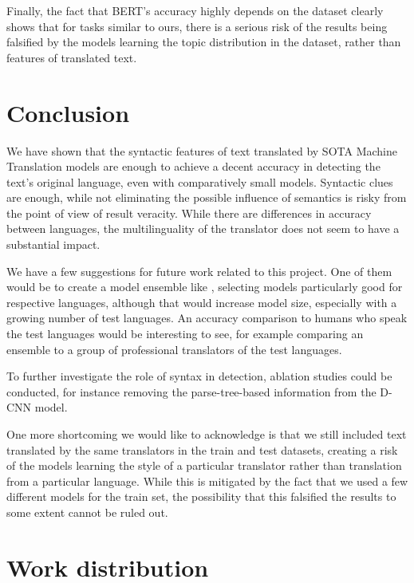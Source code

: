 \documentclass[twocolumn]{article}
\begin{document}
Finally, the fact that BERT's accuracy highly depends on the dataset clearly shows that for tasks similar to ours, there is a serious risk of the results being falsified by the models learning the topic distribution in the dataset, rather than features of translated text.


\section*{Conclusion}

We have shown that the syntactic features of text translated by SOTA Machine Translation models are enough to achieve a decent accuracy in detecting the text's original language, even with comparatively small models. Syntactic clues are enough, while not eliminating the possible influence of semantics is risky from the point of view of result veracity. While there are differences in accuracy between languages, the multilinguality of the translator does not seem to have a substantial impact.

We have a few suggestions for future work related to this project. One of them would be to create a model ensemble like \cite{roundtrip}, selecting models particularly good for respective languages, although that would increase model size, especially with a growing number of test languages. An accuracy comparison to humans who speak the test languages would be interesting to see, for example comparing an ensemble to a group of professional translators of the test languages.

To further investigate the role of syntax in detection, ablation studies could be conducted, for instance removing the parse-tree-based information from the D-CNN model.

One more shortcoming we would like to acknowledge is that we still included text translated by the same translators in the train and test datasets, creating a risk of the models learning the style of a particular translator rather than translation from a particular language. While this is mitigated by the fact that we used a few different models for the train set, the possibility that this falsified the results to some extent cannot be ruled out.


\section*{Work distribution}
\end{document}
